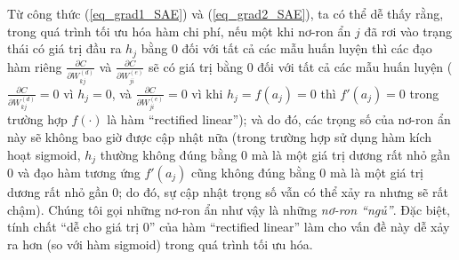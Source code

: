 Từ công thức (\ref{eq_grad1_SAE}) và (\ref{eq_grad2_SAE}), ta có thể dễ thấy rằng, trong quá trình tối ưu hóa hàm chi phí, nếu một khi nơ-ron ẩn $j$ đã rơi vào trạng thái có giá trị đầu ra $h_j$ bằng 0 đối với tất cả các mẫu huấn luyện thì các đạo hàm riêng $\frac{\partial C}{\partial W^{(d)}_{kj}}$ và $\frac{\partial C}{\partial W^{(e)}_{ji}}$ sẽ có giá trị bằng 0 đối với tất cả các mẫu huấn luyện ($\frac{\partial C}{\partial W^{(d)}_{kj}} = 0$ vì $h_j = 0$, và $\frac{\partial C}{\partial W^{(e)}_{ji}} = 0$ vì khi $h_j = f(a_j) = 0$ thì $f'(a_j) = 0$ trong trường hợp $f(\cdot)$ là hàm ``rectified linear''); và do đó, các trọng số của nơ-ron ẩn này sẽ không bao giờ được cập nhật nữa (trong trường hợp sử dụng hàm kích hoạt sigmoid, $h_j$ thường không đúng bằng 0 mà là một giá trị dương rất nhỏ gần 0 và đạo hàm tương ứng $f'(a_j)$ cũng không đúng bằng 0 mà là một giá trị dương rất nhỏ gần 0; do đó, sự cập nhật trọng số vẫn có thể xảy ra nhưng sẽ rất chậm). Chúng tôi gọi những nơ-ron ẩn như vậy là những \emph{nơ-ron ``ngủ''}. Đặc biệt, tính chất ``dễ cho giá trị 0'' của hàm ``rectified linear'' làm cho vấn đề này dễ xảy ra hơn (so với hàm sigmoid) trong quá trình tối ưu hóa.

